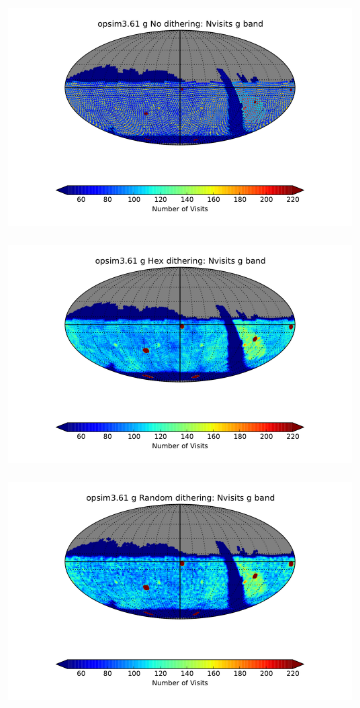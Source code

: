 \documentclass[]{spie}  %
\begin{document}
\begin{figure}
\centering
\begin{subfigure}[]{0.3\textwidth}
\includegraphics[width=\textwidth]{figures/opsim3_61_Nvisits_g_band_g_No_dithering_HEAL_SkyMap}
\caption[]{}
\label{subfig:nvisgno}
\end{subfigure}
\begin{subfigure}[]{0.3\textwidth}
\includegraphics[width=\textwidth]{figures/opsim3_61_Nvisits_g_band_g_Hex_dithering_HEAL_SkyMap}
\caption[]{}
\label{subfig:nvisghex}
\end{subfigure}
\begin{subfigure}[]{0.3\textwidth}
\includegraphics[width=\textwidth]{figures/opsim3_61_Nvisits_g_band_g_Random_dithering_HEAL_SkyMap}
\caption[]{}
\label{subfig:nvisgrandom}
\end{subfigure}


\end{figure}
\end{document}
